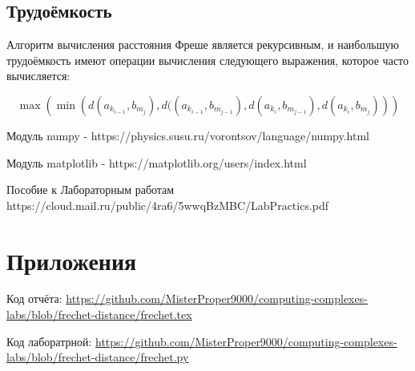 \documentclass[a4]{article}
\begin{document}
\subsection{Трудоёмкость}
Алгоритм вычисления расстояния Фреше является рекурсивным, и наибольшую трудоёмкость имеют операции вычисления следующего выражения, которое часто вычисляется:

\begin{equation}
    \max\left(\min\left(d\left(a_{k_{i-1}},b_{m_j}\right),d(\left(a_{k_{i-1}},b_{m_{j-1}}\right),d\left(a_{k_i},b_{m_{j-1}}\right),d\left(a_{k_i},b_{m_j}\right)\right)\right)
\end{equation}

\begin{thebibliography}{}
      Модуль numpy  -  https://physics.susu.ru/vorontsov/language/numpy.html
    
    Модуль matplotlib - https://matplotlib.org/users/index.html
    
    Пособие к Лабораторным работам https://cloud.mail.ru/public/4ra6/5wwqBzMBC/LabPractics.pdf
\end{thebibliography}

\section{Приложения}

Код отчёта:\; \url{https://github.com/MisterProper9000/computing-complexes-labs/blob/frechet-distance/frechet.tex}

Код лаборатрной:\; \url{https://github.com/MisterProper9000/computing-complexes-labs/blob/frechet-distance/frechet.py}


\end{document}
